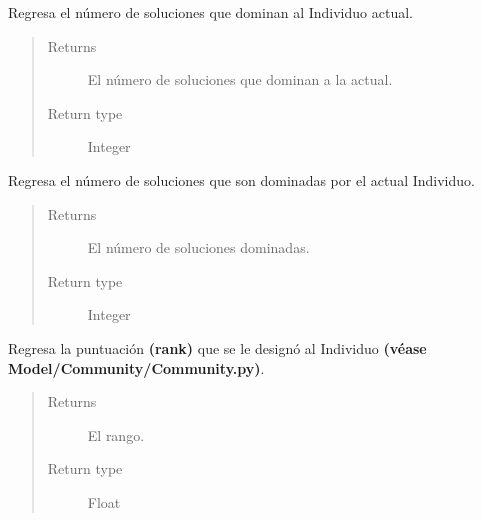 \documentclass[class=report, crop=false]{standalone}
\begin{document}
\begin{fulllineitems}
\begin{fulllineitems}

Regresa el número de soluciones que dominan al 
Individuo actual.

\begin{quote}\begin{description}
\item[{Returns}] \leavevmode
El número de soluciones que dominan a la actual.
\item[{Return type}] \leavevmode
Integer
\end{description}\end{quote}

\end{fulllineitems}

\begin{fulllineitems}

Regresa el número de soluciones que son dominadas por 
el actual Individuo.

\begin{quote}\begin{description}
\item[{Returns}] \leavevmode
El número de soluciones dominadas.
\item[{Return type}] \leavevmode
Integer
\end{description}\end{quote}

\end{fulllineitems}

\begin{fulllineitems}

Regresa la puntuación \textbf{(rank)} que se le 
designó al Individuo \textbf{(véase Model/Community/Community.py)}.

\begin{quote}\begin{description}
\item[{Returns}] \leavevmode
El rango.
\item[{Return type}] \leavevmode
Float
\end{description}\end{quote}

\end{fulllineitems}


\end{fulllineitems}
\end{document}
